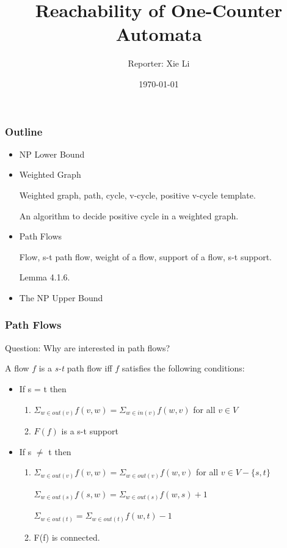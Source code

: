 \documentclass{beamer}
\title{Reachability of One-Counter Automata}
\author{Reporter: Xie Li}
\date{\today}
\begin{document}
\begin{frame}
\maketitle
\end{frame}

\begin{frame}\frametitle{Outline}
\begin{itemize}
\item NP Lower Bound
\item Weighted Graph

Weighted graph, path, cycle, v-cycle, positive v-cycle template.

An algorithm to decide positive cycle in a weighted graph.

\item Path Flows

Flow, s-t path flow, weight of a flow, support of a flow, s-t support.

Lemma 4.1.6.


\item The NP Upper Bound



\end{itemize}
\end{frame}


\begin{frame}
\frametitle{Path Flows}

Question: Why are interested in path flows?

\begin{lemma}[4.1.6] A flow $f$ is a \textit{s-t} path flow iff $f$ satisfies the following conditions:
\begin{itemize}
\item If s = t then
\begin{enumerate}
\item $\Sigma_{w\in out(v)} f(v,w) = \Sigma_{w\in in(v)} f(w,v)$ for all $v\in V$
\item $F(f)$ is a s-t support


\end{enumerate}


\item If s $\ne$ t then
\begin{enumerate}
\item $\Sigma_{w\in out(v)} f(v,w) = \Sigma_{w\in out(v)} f(w,v)$ for all $v\in V-\{s,t\}$

$\Sigma_{w\in out(s)} f(s,w) = \Sigma_{w\in out(s)} f(w,s) + 1$

$\Sigma_{w\in out(t)} = \Sigma_{w\in out(t)} f(w,t) - 1$


\item F(f) is connected.
\end{enumerate}

\end{itemize}



\end{lemma}

\end{frame}
\end{document}
